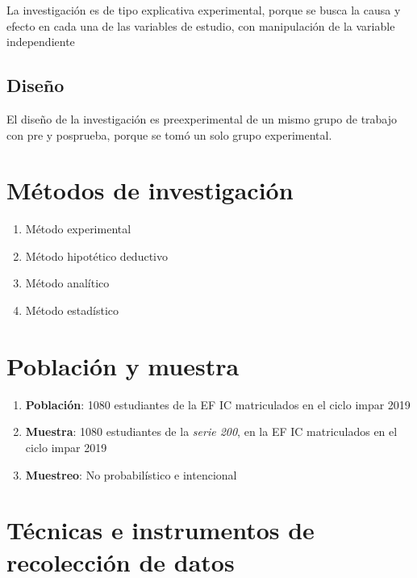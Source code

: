 \documentclass[12pt,]{report}
\begin{document}
La investigación es de tipo explicativa experimental, porque se busca la causa y efecto
en cada una de las variables de estudio, con manipulación de la variable independiente

\hypertarget{diseuxf1o}{%
\subsection{Diseño}\label{diseuxf1o}}

El diseño de la investigación es preexperimental de un mismo grupo de trabajo con pre y
posprueba, porque se tomó un solo grupo experimental.

\hypertarget{muxe9todos-de-investigaciuxf3n}{%
\section{Métodos de investigación}\label{muxe9todos-de-investigaciuxf3n}}

\begin{enumerate}
\def\labelenumi{\arabic{enumi}.}
\item
  Método experimental
\item
  Método hipotético deductivo
\item
  Método analítico
\item
  Método estadístico
\end{enumerate}

\hypertarget{poblaciuxf3n-y-muestra}{%
\section{Población y muestra}\label{poblaciuxf3n-y-muestra}}

\begin{enumerate}
\def\labelenumi{\arabic{enumi}.}
\item
  \textbf{Población}: 1080 estudiantes de la EF IC matriculados en el ciclo impar 2019
\item
  \textbf{Muestra}: 1080 estudiantes de la \emph{serie 200}, en la EF IC matriculados en el ciclo impar 2019
\item
  \textbf{Muestreo}: No probabilístico e intencional
\end{enumerate}

\hypertarget{tuxe9cnicas-e-instrumentos-de-recolecciuxf3n-de-datos}{%
\section{Técnicas e instrumentos de recolección de datos}\label{tuxe9cnicas-e-instrumentos-de-recolecciuxf3n-de-datos}}
\end{document}
